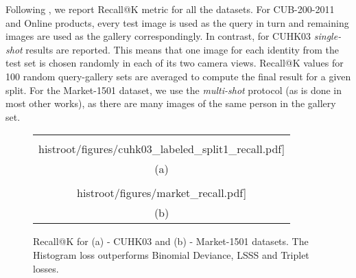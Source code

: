 Following \citep{Song16,Yi14,Zheng15}, we report Recall@K metric for all the datasets.  For CUB-200-2011 and Online products,  every test image is used as the query in turn and remaining images are used as the gallery correspondingly. In contrast, for CUHK03 \textit{single-shot} results are reported. This means that one image for each identity from the test set is chosen randomly in each of its two camera views. Recall@K values for 100 random query-gallery sets are averaged to compute the final result for a given split. For the Market-1501 dataset, we use the \textit{multi-shot} protocol (as is done in most other works), as there are many images of the same person in the gallery set.
 

\begin{figure}
\begin{center}
\begin{tabular}{c}
 
        \texttt{[image: \\histroot/figures/cuhk03\_labeled\_split1\_recall.pdf]} \\
        (a) \\
  
    
        \texttt{[image: \\histroot/figures/market\_recall.pdf]}\\
        (b) \\

\end{tabular}
    \caption{Recall@K for (a) - CUHK03 and (b) -  Market-1501 datasets. The Histogram loss  outperforms Binomial Deviance, LSSS and Triplet losses. }
    \label{fig:reid_recall}   
\end{center}
\end{figure}


